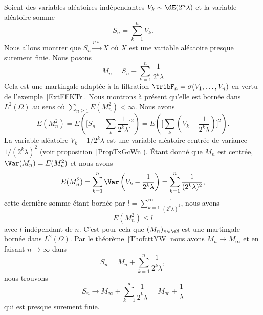 \begin{example}
	Soient des variables aléatoires indépendantes \( V_k\sim\dE(2^n\lambda)\) et la variable aléatoire somme
	\begin{equation}
		S_n=\sum_{k=1}^nV_k.
	\end{equation}
	Nous allons montrer que \( S_n\stackrel{p.s.}{\longrightarrow}X\) où \( X\) est une variable aléatoire presque surement finie. Nous posons
	\begin{equation}
		M_n=S_n-\sum_{k=1}^n\frac{1}{ 2^k\lambda }
	\end{equation}
	Cela est une martingale adaptée à la filtration \( \tribF_n=\sigma(V_1,\ldots, V_n)\) en vertu de l'exemple~\ref{ExtFFKTr}. Nous montrons à présent qu'elle est bornée dans \( L^2(\Omega)\) au sens où \( \sum_{n\geq 1}E(M_n^2)<\infty\). Nous avons
	\begin{equation}
		E(M_n^2)=E\left( \big[ S_n-\sum_k\frac{1}{ 2^k\lambda } \big]^2 \right)=E\left( \big[ \sum_k(V_k-\frac{1}{ 2^k\lambda }) \big]^2 \right).
	\end{equation}
	La variable aléatoire \( V_k-1/2^k\lambda\) est une variable aléatoire centrée de variance \( 1/(2^k\lambda)^2\) (voir proposition~\ref{PropTxGcWn}). Étant donné que \( M_n\) est centrée, \( \Var(M_n)=E(M_n^2)\) et nous avons
	\begin{equation}
		E(M_n^2)=\sum_{k=1}^n\Var\left( V_k-\frac{1}{ 2^k\lambda } \right)=\sum_{k=1}^n\frac{1}{ (2^k\lambda)^2 },
	\end{equation}
	cette dernière somme étant bornée par \( l=\sum_{k=1}^{\infty}\frac{1}{ (2^k\lambda)^2 }\), nous avons
	\begin{equation}
		E(M_n^2)\leq l
	\end{equation}
	avec \( l\) indépendant de \( n\). C'est pour cela que \( (M_n)_{n\in \eN}\) est une martingale bornée dans \( L^2(\Omega)\). Par le théorème~\ref{ThofcttYW} nous avons \( M_n\to M_{\infty}\) et en faisant \( n\to \infty\) dans
	\begin{equation}
		S_n=M_n+\sum_{k=1}^n\frac{1}{ 2^k\lambda },
	\end{equation}
	nous trouvons
	\begin{equation}
		S_n\to M_{\infty}+\sum_{k=1}^{\infty}\frac{1}{ 2^k\lambda }=M_{\infty}+\frac{1}{ \lambda }
	\end{equation}
	qui est presque surement finie.
\end{example}

